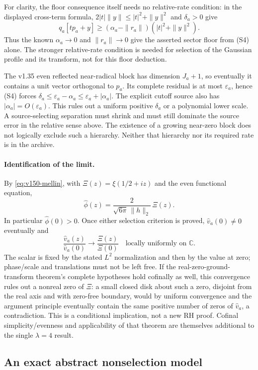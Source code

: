 For clarity, the floor consequence itself needs no relative-rate
condition: in the displayed cross-term formula,
$2|t|\|y\|\le |t|^2+\|y\|^2$ and $\delta_a>0$ give
\[
 q_a[tp_a+y]\ge(\alpha_a-\|r_a\|)(|t|^2+\|y\|^2).
\]
Thus the known $\alpha_a\to0$ and $\|r_a\|\to0$ give the asserted
sector floor from (S4) alone. The stronger relative-rate condition
is needed for selection of the Gaussian profile and its transform,
not for this floor deduction.

The v1.35 even reflected near-radical block has dimension $J_a+1$,
so eventually it contains a unit vector orthogonal to $p_a$. Its complete
residual is at most $\varepsilon_a$, hence (S4) forces
$\delta_a\le\varepsilon_a-\alpha_a\le\varepsilon_a+|\alpha_a|$.
The explicit cutoff source also has $|\alpha_a|=O(\varepsilon_a)$.
This rules out a uniform positive $\delta_a$ or a polynomial lower scale.
A source-selecting separation must shrink and must still dominate the
source error in the relative sense above. The existence of a growing
near-zero block does not logically exclude such a hierarchy. Neither
that hierarchy nor its required rate is in the archive.

\paragraph{Identification of the limit.}
By \eqref{eq:v150-mellin}, with
$\Xi(z)=\xi(1/2+iz)$ and the even functional equation,
\[
 \widehat\phi(z)=\frac{2}{\sqrt{6\pi}\,\|h\|_2}\,\Xi(z).
\]
In particular $\widehat\phi(0)>0$. Once either selection criterion is
proved, $\widehat v_a(0)\ne0$ eventually and
\[
 \frac{\widehat v_a(z)}{\widehat v_a(0)}
 \longrightarrow\frac{\Xi(z)}{\Xi(0)}
 \quad\text{locally uniformly on }\mathbb C.
\]
The scalar is fixed by the stated $L^2$ normalization and then by the
value at zero; phase/scale and translations must not be left free.
If the real-zero-ground-transform theorem's complete hypotheses hold
cofinally as well, this convergence rules out a nonreal zero of $\Xi$:
a small closed disk about such a zero, disjoint from the real axis and
with zero-free boundary, would by uniform convergence and the argument
principle eventually contain the same positive number of zeros of
$\widehat v_a$, a contradiction. This is a conditional implication,
not a new RH proof. Cofinal simplicity/evenness and applicability of
that theorem are themselves additional to the single $\lambda=4$ result.

\subsection*{An exact abstract nonselection model}


